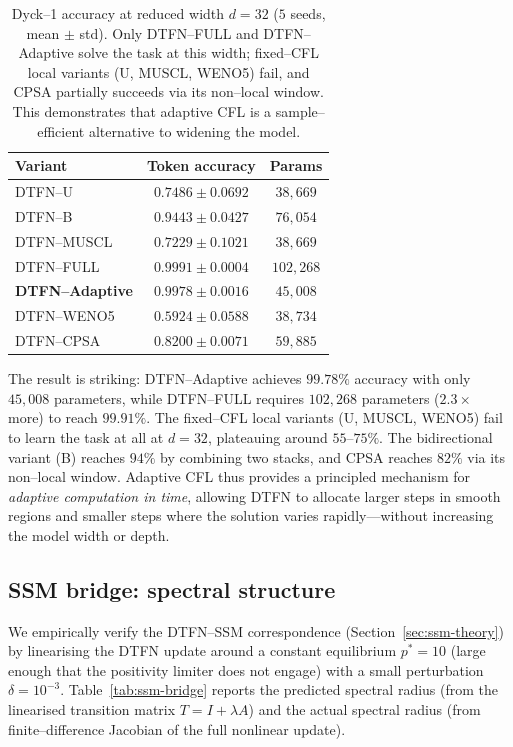 \documentclass[10pt]{article}
\theoremstyle{definition}
\theoremstyle{remark}
\begin{document}
\begin{table}[h]
  \centering
  \caption{Dyck--1 accuracy at reduced width $d = 32$ ($5$ seeds,
    mean $\pm$ std).  Only DTFN--FULL and DTFN--Adaptive solve the
    task at this width; fixed--CFL local variants (U, MUSCL, WENO5)
    fail, and CPSA partially succeeds via its non--local window.  This
    demonstrates that adaptive CFL is a sample--efficient alternative
    to widening the model.}
  \label{tab:adaptive-efficiency}
  \begin{tabular}{lcc}
    \toprule
    Variant & Token accuracy & Params \\
    \midrule
    DTFN--U        & $0.7486 \pm 0.0692$ & $38{,}669$ \\
    DTFN--B        & $0.9443 \pm 0.0427$ & $76{,}054$ \\
    DTFN--MUSCL    & $0.7229 \pm 0.1021$ & $38{,}669$ \\
    DTFN--FULL     & $0.9991 \pm 0.0004$ & $102{,}268$ \\
    \textbf{DTFN--Adaptive} & $\mathbf{0.9978 \pm 0.0016}$ & $45{,}008$ \\
    DTFN--WENO5    & $0.5924 \pm 0.0588$ & $38{,}734$ \\
    DTFN--CPSA     & $0.8200 \pm 0.0071$ & $59{,}885$ \\
    \bottomrule
  \end{tabular}
\end{table}

The result is striking: DTFN--Adaptive achieves $99.78\%$ accuracy
with only $45{,}008$ parameters, while DTFN--FULL requires
$102{,}268$ parameters ($2.3\times$ more) to reach $99.91\%$.  The
fixed--CFL local variants (U, MUSCL, WENO5) fail to learn the task at
all at $d = 32$, plateauing around $55$--$75\%$.  The bidirectional
variant (B) reaches $94\%$ by combining two stacks, and CPSA reaches
$82\%$ via its non--local window.  Adaptive CFL thus provides a
principled mechanism for \emph{adaptive computation in time}, allowing
DTFN to allocate larger steps in smooth regions and smaller steps
where the solution varies rapidly---without increasing the model
width or depth.

\subsection{SSM bridge: spectral structure}
\label{sec:ssm-bridge}

We empirically verify the DTFN--SSM correspondence
(Section~\ref{sec:ssm-theory}) by linearising the DTFN update around
a constant equilibrium $p^* = 10$ (large enough that the positivity
limiter does not engage) with a small perturbation $\delta = 10^{-3}$.
Table~\ref{tab:ssm-bridge} reports the predicted spectral radius
(from the linearised transition matrix $T = I + \lambda A$) and the
actual spectral radius (from finite--difference Jacobian of the full
nonlinear update).
\end{document}
